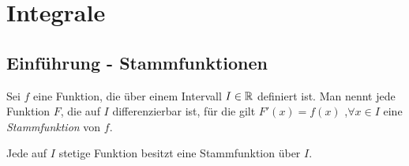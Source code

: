 \chapter{Integrale}
\section{Einführung - Stammfunktionen}
\begin{Definition}
  Sei $f$ eine Funktion, die über einem Intervall $I\in\mathbb{R}$ definiert ist. Man nennt jede Funktion $F$, die auf $I$ differenzierbar ist, für die gilt $F'(x)=f(x)$ ,$\forall x\in I$ eine \emph{Stammfunktion} von $f$.
\end{Definition}
\begin{Theorem}
  Jede auf $I$ stetige Funktion besitzt eine Stammfunktion über $I$.
\end{Theorem}


